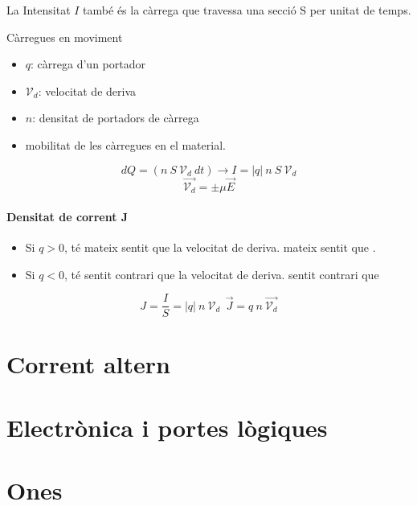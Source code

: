 \documentclass[12pt, a4paper, twoside]{report}
\begin{document}
La Intensitat \(I\) també és la càrrega que travessa una secció S per unitat de temps. 

Càrregues en moviment
\begin{itemize}
    \item \(q\): càrrega d'un portador
    \item \(\mathcal{V}_d\): velocitat de deriva
    \item \(n\): densitat de portadors de càrrega
    \item \mu mobilitat de les càrregues en el material. 
\end{itemize}
$$dQ = (n \ S  \ \mathcal{V}_d \ dt) \longrightarrow I = | q \vert \ n \ S  \ \mathcal{V}_d  $$
$$ \overrightarrow{\mathcal{V}_d} = \pm \mu \overrightarrow{E} $$ 
\subsubsection{Densitat de corrent \textbf{J}}
\begin{itemize}
    \item Si \(q > 0\),  té mateix sentit que la velocitat de deriva.  mateix sentit que . 
    \item Si \(q < 0\),  té sentit contrari que la velocitat de deriva.  sentit contrari que 
\end{itemize}
$$J = \frac{I}{S} = | q \vert \ n \ \mathcal{V}_d \ \ \overrightarrow{J} = q \ n \ \overrightarrow{\mathcal{V}_d}$$
\chapter{Corrent altern}
\chapter{Electrònica i portes lògiques}
\chapter{Ones}
\end{document}
